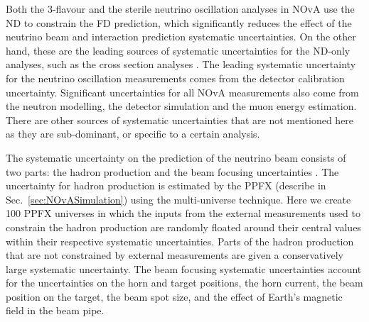 Both the 3-flavour \cite{NOvAResults2021.pdf} and the sterile neutrino \cite{NOvASterilesFHCRHCResults2021.pdf} oscillation analyses in \gls{NOvA} use the \gls{ND} to constrain the \gls{FD} prediction, which significantly reduces the effect of the neutrino beam and interaction prediction systematic uncertainties. On the other hand, these are the leading sources of systematic uncertainties for the \gls{ND}-only analyses, such as the cross section analyses \cite{NOvANCPi0XSecMeasurement2019.pdf, NOvANumuCCXSexMeasurement2023.pdf, NOvANueCCXSecMeasurement2023.pdf, NOvANuMuCCPi0XSecMeasurement2023.pdf}. The leading systematic uncertainty for the neutrino oscillation measurements comes from the detector calibration uncertainty. Significant uncertainties for all NOvA measurements also come from the neutron modelling, the detector simulation and the muon energy estimation. There are other sources of systematic uncertainties that are not mentioned here as they are sub-dominant, or specific to a certain analysis.

The systematic uncertainty on the prediction of the neutrino beam consists of two parts: the hadron production and the beam focusing uncertainties \cite{NuMIFlux.pdf}. The uncertainty for hadron production is estimated by the \gls{PPFX} (describe in Sec.~\ref{sec:NOvASimulation}) using the multi-universe technique. Here we create 100 \gls{PPFX} universes in which the inputs from the external measurements used to constrain the hadron production are randomly floated around their central values within their respective systematic uncertainties. Parts of the hadron production that are not constrained by external measurements are given a conservatively large systematic uncertainty. The beam focusing systematic uncertainties account for the uncertainties on the horn and target positions, the horn current, the beam position on the target, the beam spot size, and the effect of Earth's magnetic field in the beam pipe. %


